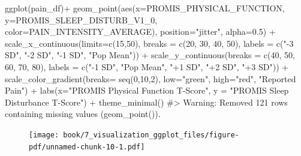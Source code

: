 \documentclass[
  letterpaper,
]{krantz}
\makeatletter
\newenvironment{Shaded}{\begin{snugshade}}{\end{snugshade}}
\newcommand{\AttributeTok}[1]{\textcolor[rgb]{0.40,0.45,0.13}{#1}}
\newcommand{\CommentTok}[1]{\textcolor[rgb]{0.37,0.37,0.37}{#1}}
\newcommand{\DecValTok}[1]{\textcolor[rgb]{0.68,0.00,0.00}{#1}}
\newcommand{\FloatTok}[1]{\textcolor[rgb]{0.68,0.00,0.00}{#1}}
\newcommand{\FunctionTok}[1]{\textcolor[rgb]{0.28,0.35,0.67}{#1}}
\newcommand{\NormalTok}[1]{\textcolor[rgb]{0.00,0.23,0.31}{#1}}
\newcommand{\SpecialCharTok}[1]{\textcolor[rgb]{0.37,0.37,0.37}{#1}}
\newcommand{\StringTok}[1]{\textcolor[rgb]{0.13,0.47,0.30}{#1}}
\newenvironment{kframe}{%
\medskip{}
\setlength{\fboxsep}{.8em}
 \def\at@end@of@kframe{}%
 \ifinner\ifhmode%
  \def\at@end@of@kframe{\end{minipage}}%
  \begin{minipage}{\columnwidth}%
 \fi\fi%
 \def\FrameCommand##1{\hskip\@totalleftmargin \hskip-\fboxsep
 \colorbox{shadecolor}{##1}\hskip-\fboxsep
     \hskip-\linewidth \hskip-\@totalleftmargin \hskip\columnwidth}%
 \MakeFramed {\advance\hsize-\width
   \@totalleftmargin\z@ \linewidth\hsize
   \@setminipage}}%
 {\par\unskip\endMakeFramed%
 \at@end@of@kframe}
\renewenvironment{Shaded}{\begin{kframe}}{\end{kframe}}
\makeatother
\begin{document}
\begin{Shaded}
\begin{Highlighting}[]
\FunctionTok{ggplot}\NormalTok{(pain\_df)}\SpecialCharTok{+}
  \FunctionTok{geom\_point}\NormalTok{(}\FunctionTok{aes}\NormalTok{(}\AttributeTok{x=}\NormalTok{PROMIS\_PHYSICAL\_FUNCTION, }\AttributeTok{y=}\NormalTok{PROMIS\_SLEEP\_DISTURB\_V1\_0, }
                 \AttributeTok{color=}\NormalTok{PAIN\_INTENSITY\_AVERAGE), }\AttributeTok{position=}\StringTok{"jitter"}\NormalTok{, }\AttributeTok{alpha=}\FloatTok{0.5}\NormalTok{) }\SpecialCharTok{+}
  \FunctionTok{scale\_x\_continuous}\NormalTok{(}\AttributeTok{limits=}\FunctionTok{c}\NormalTok{(}\DecValTok{15}\NormalTok{,}\DecValTok{50}\NormalTok{), }\AttributeTok{breaks =} \FunctionTok{c}\NormalTok{(}\DecValTok{20}\NormalTok{, }\DecValTok{30}\NormalTok{, }\DecValTok{40}\NormalTok{, }\DecValTok{50}\NormalTok{), }
                     \AttributeTok{labels =} \FunctionTok{c}\NormalTok{(}\StringTok{"{-}3 SD"}\NormalTok{, }\StringTok{"{-}2 SD"}\NormalTok{, }\StringTok{"{-}1 SD"}\NormalTok{, }\StringTok{"Pop Mean"}\NormalTok{)) }\SpecialCharTok{+} 
  \FunctionTok{scale\_y\_continuous}\NormalTok{(}\AttributeTok{breaks =} \FunctionTok{c}\NormalTok{(}\DecValTok{40}\NormalTok{, }\DecValTok{50}\NormalTok{, }\DecValTok{60}\NormalTok{, }\DecValTok{70}\NormalTok{, }\DecValTok{80}\NormalTok{), }
                     \AttributeTok{labels =} \FunctionTok{c}\NormalTok{(}\StringTok{"{-}1 SD"}\NormalTok{, }\StringTok{"Pop Mean"}\NormalTok{, }\StringTok{"+1 SD"}\NormalTok{, }\StringTok{"+2 SD"}\NormalTok{, }
                                \StringTok{"+3 SD"}\NormalTok{)) }\SpecialCharTok{+}
  \FunctionTok{scale\_color\_gradient}\NormalTok{(}\AttributeTok{breaks=} \FunctionTok{seq}\NormalTok{(}\DecValTok{0}\NormalTok{,}\DecValTok{10}\NormalTok{,}\DecValTok{2}\NormalTok{), }\AttributeTok{low=}\StringTok{"green"}\NormalTok{, }\AttributeTok{high=}\StringTok{"red"}\NormalTok{, }
                       \StringTok{"Reported Pain"}\NormalTok{) }\SpecialCharTok{+}
  \FunctionTok{labs}\NormalTok{(}\AttributeTok{x=}\StringTok{"PROMIS Physical Function T{-}Score"}\NormalTok{, }
       \AttributeTok{y =} \StringTok{"PROMIS Sleep Disturbance T{-}Score"}\NormalTok{) }\SpecialCharTok{+} 
  \FunctionTok{theme\_minimal}\NormalTok{()}
\CommentTok{\#\textgreater{} Warning: Removed 121 rows containing missing values (\textasciigrave{}geom\_point()\textasciigrave{}).}
\end{Highlighting}
\end{Shaded}

\begin{figure}[H]

{\centering \texttt{[image: book/7\_visualization\_ggplot\_files/figure-pdf/unnamed-chunk-10-1.pdf]}

}

\end{figure}
\end{document}
